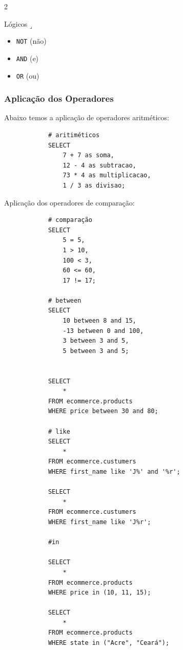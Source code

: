 \documentclass[a4paper]{article}
\begin{document}
\begin{multicols}{2}
            \medskip
            
            Lógicos\(\lrcorner\)
            
            \begin{itemize}
                \item \texttt{NOT} (não)
                \item \texttt{AND} (e)
                \item \texttt{OR} (ou)
            \end{itemize}
        \end{multicols} 
        
        \subsubsection{Aplicação dos Operadores}
        
        Abaixo temos a aplicação de operadores aritméticos:
        
        \bigskip
        
        \begin{verbatim}
            # aritiméticos
            SELECT
                7 + 7 as soma,
                12 - 4 as subtracao,
                73 * 4 as multiplicacao,
                1 / 3 as divisao;
        \end{verbatim}
        
        \bigskip
        
        \pagebreak[1-4]
        
        Aplicação dos operadores de comparação:
        
        \bigskip
        
        \begin{verbatim}
            # comparação
            SELECT
                5 = 5,
                1 > 10,
                100 < 3,
                60 <= 60,
                17 != 17;
                
            # between
            SELECT
                10 between 8 and 15,
                -13 between 0 and 100,
                3 between 3 and 5,
                5 between 3 and 5;
                
                
            SELECT
                *
            FROM ecommerce.products
            WHERE price between 30 and 80;
            
            # like
            SELECT
                *
            FROM ecommerce.custumers
            WHERE first_name like 'J%' and '%r';    
             
            SELECT
                *
            FROM ecommerce.custumers
            WHERE first_name like 'J%r';
            
            #in
            
            SELECT
                *
            FROM ecommerce.products
            WHERE price in (10, 11, 15);
            
            SELECT
                *
            FROM ecommerce.products
            WHERE state in ("Acre", "Ceará");             
        \end{verbatim}
               
        \bigskip
           
\end{document}

